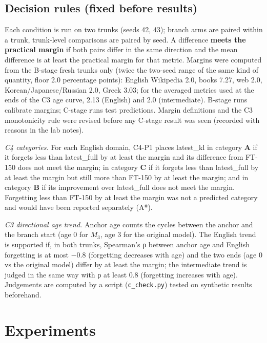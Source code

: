 \documentclass[11pt]{article}
\begin{document}
\subsection{Decision rules (fixed before results)}
Each condition is run on two trunks (seeds 42, 43); branch arms are paired within a trunk, trunk-level comparisons are paired by seed. A difference \textbf{meets the practical margin} if both pairs differ in the same direction and the mean difference is at least the practical margin for that metric. Margins were computed from the B-stage fresh trunks only (twice the two-seed range of the same kind of quantity, floor 2.0 percentage points): English Wikipedia 2.0, books 7.27, web 2.0, Korean/Japanese/Russian 2.0, Greek 3.03; for the averaged metrics used at the ends of the C3 age curve, 2.13 (English) and 2.0 (intermediate). B-stage runs calibrate margins; C-stage runs test predictions. Margin definitions and the C3 monotonicity rule were revised before any C-stage result was seen (recorded with reasons in the lab notes).

\emph{C4 categories.} For each English domain, C4-P1 places latest\_kl in category \textbf{A} if it forgets less than latest\_full by at least the margin and its difference from FT-150 does not meet the margin; in category \textbf{C} if it forgets less than latest\_full by at least the margin but still more than FT-150 by at least the margin; and in category \textbf{B} if its improvement over latest\_full does not meet the margin. Forgetting less than FT-150 by at least the margin was not a predicted category and would have been reported separately (A*).

\emph{C3 directional age trend.} Anchor age counts the cycles between the anchor and the branch start (age 0 for $M_3$, age 3 for the original model). The English trend is supported if, in both trunks, Spearman's ρ between anchor age and English forgetting is at most −0.8 (forgetting decreases with age) and the two ends (age 0 vs the original model) differ by at least the margin; the intermediate trend is judged in the same way with ρ at least 0.8 (forgetting increases with age). Judgements are computed by a script (\texttt{c\_check.py}) tested on synthetic results beforehand.


\section{Experiments}
\end{document}
